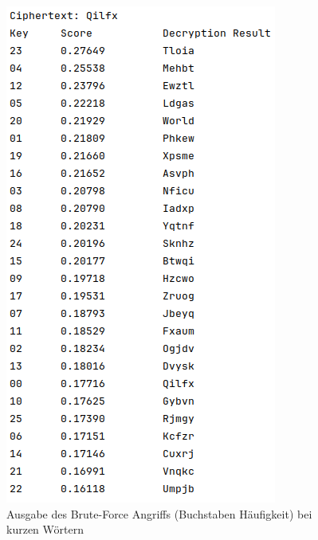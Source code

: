 \documentclass{article}
\begin{document}
    \begin{figure}
        \includegraphics[scale=0.5]{text_results/console_out3.png}
        \caption{Ausgabe des Brute-Force Angriffs (Buchstaben Häufigkeit) bei kurzen Wörtern}
        \label{fig:buchstaben_bad}
    \end{figure}
\end{document}
